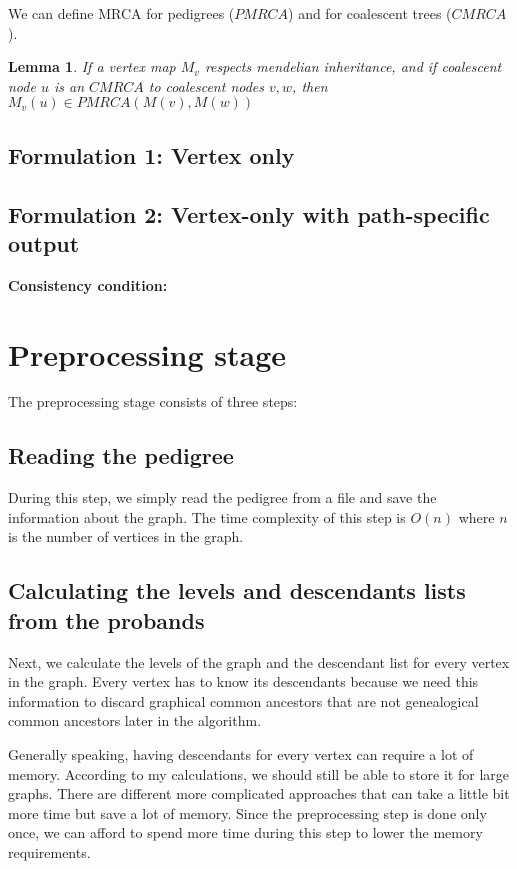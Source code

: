 \documentclass[14pt]{extarticle}
\newtheorem{lemma}{Lemma}
\begin{document}
We can define MRCA for pedigrees ($PMRCA$) and for coalescent trees ($CMRCA$).


\begin{lemma}
If a vertex map $M_v$ respects mendelian inheritance, and if coalescent node $u$ is an $CMRCA$ to coalescent nodes $v, w$, then $M_v(u) \in PMRCA(M(v),M(w))$   
\end{lemma}



 

\subsection{Formulation 1: Vertex only} 

\subsection{Formulation 2: Vertex-only with path-specific output}

\textbf{Consistency condition:} 

\section{Preprocessing stage}

The preprocessing stage consists of three steps:

\subsection{Reading the pedigree}

During this step, we simply read the pedigree from a file and save the information about the graph. The time complexity of this step is $O(n)$ where $n$ is the number of vertices in the graph.

\subsection{Calculating the levels and descendants lists from the probands}

Next, we calculate the levels of the graph and the descendant list for every vertex in the graph. Every vertex has to know its descendants because we need this information to discard graphical common ancestors that are not genealogical common ancestors later in the algorithm.

Generally speaking, having descendants for every vertex can require a lot of memory. According to my calculations, we should still be able to store it for large graphs. There are different more complicated approaches that can take a little bit more time but save a lot of memory. Since the preprocessing step is done only once, we can afford to spend more time during this step to lower the memory requirements.
\end{document}
